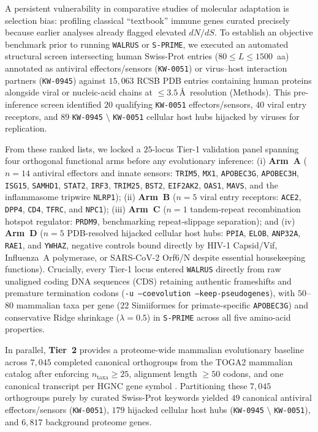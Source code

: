 \documentclass[11pt,letterpaper]{article}
\newcommand{\WALRUS}{\texttt{WALRUS}\xspace}
\newcommand{\SPRIME}{\texttt{S-PRIME}\xspace}
\begin{document}
A persistent vulnerability in comparative studies of molecular adaptation is selection bias: profiling classical ``textbook'' immune genes curated precisely because earlier analyses already flagged elevated $dN/dS$. To establish an objective benchmark prior to running \WALRUS or \SPRIME, we executed an automated structural screen intersecting human Swiss-Prot entries ($80 \le L \le 1500$~aa) annotated as antiviral effectors/sensors (\texttt{KW-0051}) or virus--host interaction partners (\texttt{KW-0945}) against $15,063$ RCSB PDB entries containing human proteins alongside viral or nucleic-acid chains at $\le 3.5$\,\AA\ resolution (Methods). This pre-inference screen identified $20$ qualifying \texttt{KW-0051} effectors/sensors, $40$ viral entry receptors, and $89$ \texttt{KW-0945} $\setminus$ \texttt{KW-0051} cellular host hubs hijacked by viruses for replication.

From these ranked lists, we locked a $25$-locus Tier-1 validation panel spanning four orthogonal functional arms before any evolutionary inference: (i) \textbf{Arm~A} ($n = 14$ antiviral effectors and innate sensors: \texttt{TRIM5}, \texttt{MX1}, \texttt{APOBEC3G}, \texttt{APOBEC3H}, \texttt{ISG15}, \texttt{SAMHD1}, \texttt{STAT2}, \texttt{IRF3}, \texttt{TRIM25}, \texttt{BST2}, \texttt{EIF2AK2}, \texttt{OAS1}, \texttt{MAVS}, and the inflammasome tripwire \texttt{NLRP1}); (ii) \textbf{Arm~B} ($n = 5$ viral entry receptors: \texttt{ACE2}, \texttt{DPP4}, \texttt{CD4}, \texttt{TFRC}, and \texttt{NPC1}); (iii) \textbf{Arm~C} ($n = 1$ tandem-repeat recombination hotspot regulator: \texttt{PRDM9}, benchmarking repeat-slippage separation); and (iv) \textbf{Arm~D} ($n = 5$ PDB-resolved hijacked cellular host hubs: \texttt{PPIA}, \texttt{ELOB}, \texttt{ANP32A}, \texttt{RAE1}, and \texttt{YWHAZ}, negative controls bound directly by HIV-1 Capsid/Vif, Influenza~A polymerase, or SARS-CoV-2 Orf6/N despite essential housekeeping functions). Crucially, every Tier-1 locus entered \WALRUS directly from raw unaligned coding DNA sequences (CDS) retaining authentic frameshifts and premature termination codons (\texttt{-u --coevolution --keep-pseudogenes}), with $50$--$80$ mammalian taxa per gene ($22$ Simiiformes for primate-specific \texttt{APOBEC3G}) and conservative Ridge shrinkage ($\lambda = 0.5$) in \SPRIME across all five amino-acid properties.

In parallel, \textbf{Tier~2} provides a proteome-wide mammalian evolutionary baseline across $7,045$ completed canonical orthogroups from the TOGA2 mammalian catalog after enforcing $n_{\text{taxa}} \ge 25$, alignment length $\ge 50$ codons, and one canonical transcript per HGNC gene symbol \citep{kirilenko2023integrating,kosakovsky2026walrus}. Partitioning these $7,045$ orthogroups purely by curated Swiss-Prot keywords yielded $49$ canonical antiviral effectors/sensors (\texttt{KW-0051}), $179$ hijacked cellular host hubs (\texttt{KW-0945} $\setminus$ \texttt{KW-0051}), and $6,817$ background proteome genes.
\end{document}
